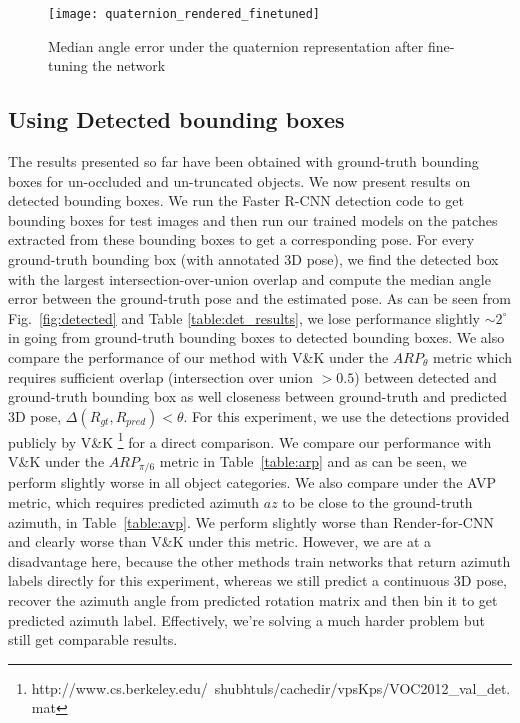 \documentclass[10pt,twocolumn,letterpaper]{article}
\begin{document}
	\begin{figure}[h]
		\centering
		\texttt{[image: quaternion\_rendered\_finetuned]}
		\caption{Median angle error under the quaternion representation after fine-tuning the network}
		\label{fig:quaternion_rendered_finetuned}
	\end{figure}

	\subsection{Using Detected bounding boxes} 
	\label{sec:detected}
	The results presented so far have been obtained with ground-truth bounding boxes for un-occluded and un-truncated objects. We now present results on detected bounding boxes. We run the Faster R-CNN \cite{Ren:FasterRCNN} detection code to get bounding boxes for test images and then run our trained models on the patches extracted from these bounding boxes to get a corresponding pose. For every ground-truth bounding box (with annotated 3D pose), we find the detected box with the largest intersection-over-union overlap and compute the median angle error between the ground-truth pose and the estimated pose. As can be seen from Fig.~\ref{fig:detected} and Table \ref{table:det_results}, we lose performance slightly $\sim 2^\circ$ in going from ground-truth bounding boxes to detected bounding boxes. We also compare the performance of our method with V\&K \cite{Tulsiani:CVPR15} under the $ARP_{\theta}$ metric which requires sufficient overlap (intersection over union $> 0.5$) between detected and ground-truth bounding box as well closeness between ground-truth and predicted 3D pose, $\Delta(R_{gt}, R_{pred}) < \theta$. For this experiment, we use the detections provided publicly by V\&K \footnote{http://www.cs.berkeley.edu/~shubhtuls/cachedir/vpsKps/VOC2012\_val\_det.mat} for a direct comparison. We compare our performance with V\&K under the $ARP_{\pi/6}$ metric in Table~\ref{table:arp} and as can be seen, we perform slightly worse in all object categories.	We also compare under the AVP metric, which requires predicted azimuth $az$ to be close to the ground-truth azimuth, in Table~\ref{table:avp}. We perform slightly worse than Render-for-CNN and clearly worse than V\&K under this metric. However, we are at a disadvantage here, because the other methods train networks that return azimuth labels directly for this experiment, whereas we still predict a continuous 3D pose, recover the azimuth angle from predicted rotation matrix and then bin it to get predicted azimuth label. Effectively, we're solving a much harder problem but still get comparable results.
\end{document}
